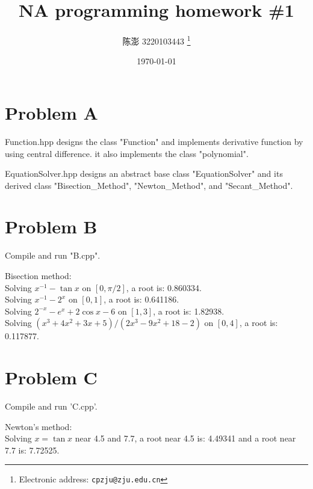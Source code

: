 \documentclass[a4paper]{article}
\begin{document}
\title{NA programming homework \#1}

\author{陈澎 3220103443
  \thanks{Electronic address: \texttt{cpzju@zju.edu.cn}}}


\date{\today}

\maketitle

\section*{Problem A}
Function.hpp designs the class "Function" and implements derivative function by using central difference. it also implements the class "polynomial".

EquationSolver.hpp designs an abstract base class "EquationSolver" and its derived class "Bisection\_Method", "Newton\_Method", and "Secant\_Method".

\section*{Problem B}
Compile and run "B.cpp". \par
Bisection method:\\
Solving $x^{-1} - \tan x$ on $[0, \pi/2]$, 
a root is: 0.860334. \\
Solving $x^{-1} - 2^x$ on $[0, 1]$, 
a root is: 0.641186. \\
Solving $2^{-x} - e^x + 2\cos x - 6$ on $[1, 3]$, 
a root is: 1.82938. \\
Solving $(x^3+4x^2+3x+5)/(2x^3-9x^2+18-2)$ on $[0, 4]$, 
a root is: 0.117877. \\

\section*{Problem C}
Compile and run 'C.cpp'. \par
Newton's method:\\
Solving $x = \tan x$ near 4.5 and 7.7,
a root near 4.5 is: 4.49341 and a root near 7.7 is: 7.72525.
\end{document}
